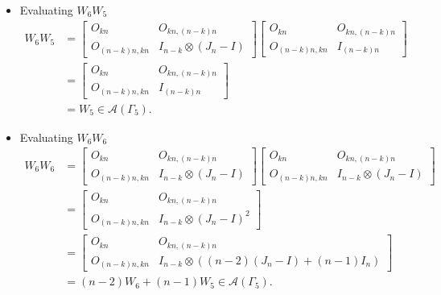 \begin{itemize}
\item Evaluating $W_{6}W_{5}$
\begin{align*}
    W_6W_5
    &= \begin{bmatrix}
        O_{kn} & O_{kn, (n-k)n} \\
        O_{(n-k)n,kn} & I_{n - k} \otimes (J_n - I)
    \end{bmatrix}
    \begin{bmatrix}
        O_{kn} & O_{kn, (n-k)n} \\
        O_{(n-k)n,kn} & I_{(n-k)n}
    \end{bmatrix}\\
    &= \begin{bmatrix}
        O_{kn} & O_{kn, (n-k)n} \\
        O_{(n-k)n,kn} & I_{(n-k)n}
    \end{bmatrix}\\
    &= W_5\in\mathcal{A}(\Gamma_5).
\end{align*}

\item Evaluating $W_{6}W_{6}$
\begin{align*}
    W_6W_6
    &= \begin{bmatrix}
        O_{kn} & O_{kn, (n-k)n} \\
        O_{(n-k)n,kn} & I_{n - k} \otimes (J_n - I)
    \end{bmatrix}
    \begin{bmatrix}
        O_{kn} & O_{kn, (n-k)n} \\
        O_{(n-k)n,kn} & I_{n - k} \otimes (J_n - I)
    \end{bmatrix}\\
    &= \begin{bmatrix}
        O_{kn} & O_{kn, (n-k)n} \\
        O_{(n-k)n,kn} & I_{n - k} \otimes (J_n - I)^2
    \end{bmatrix}\\
    &= \begin{bmatrix}
        O_{kn} & O_{kn, (n-k)n} \\
        O_{(n-k)n,kn} & I_{n - k} \otimes ((n-2)(J_n - I) + (n-1)I_n)
    \end{bmatrix}\\
    &=(n-2)W_6 + (n-1)W_5\in\mathcal{A}(\Gamma_5).
\end{align*}


\end{itemize}
